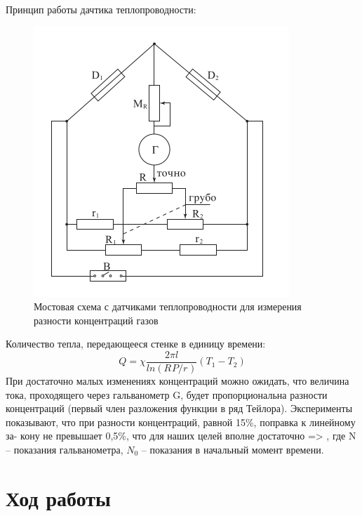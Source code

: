 \documentclass[11pt,a4paper]{article}
\begin{document}
Принцип работы дачтика теплопроводности:
\begin{figure}
  \includegraphics*[width=\textwidth]{ust2.png}
  \caption{Мостовая схема
  с датчиками теплопроводности для измерения разности концентраций газов}
  \label{fig:ust2}
\end{figure}
Количество тепла, передающееся стенке в единицу времени:
\begin{equation}
  Q = \chi \frac{2 \pi l}{ln(R_\text{}P/r_\text{})}(T_1 - T_2)
\end{equation}
При достаточно малых изменениях концентраций можно ожидать,
что величина тока, проходящего через гальванометр G,
будет пропорциональна разности концентраций (первый
член разложения функции в ряд Тейлора). Эксперименты показывают,
что при разности концентраций, равной 15\%, поправка к линейному за-
кону не превышает 0,5\%, что для наших целей вполне достаточно => , где
N -- показания гальванометра, $N_0$ -- показания в начальный момент времени.
\section*{Ход работы}
\end{document}
